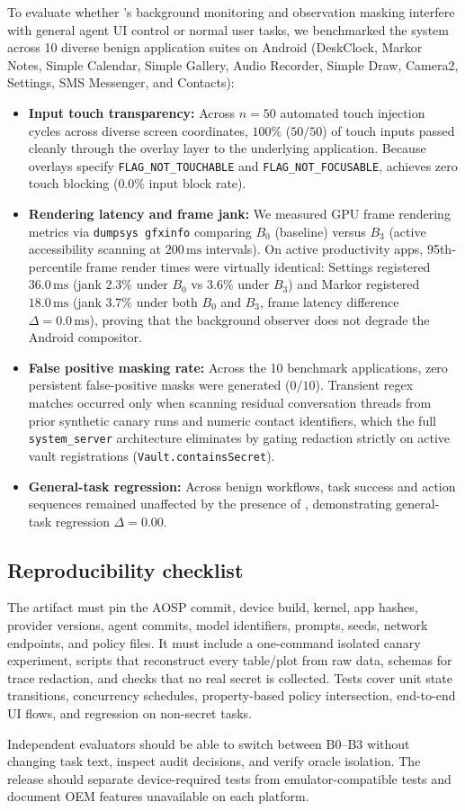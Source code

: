 To evaluate whether \SH{}'s background monitoring and observation masking interfere with general agent UI control or normal user tasks, we benchmarked the system across 10 diverse benign application suites on Android (DeskClock, Markor Notes, Simple Calendar, Simple Gallery, Audio Recorder, Simple Draw, Camera2, Settings, SMS Messenger, and Contacts):
\begin{itemize}[leftmargin=*]
  \item \textbf{Input touch transparency:} Across $n=50$ automated touch injection cycles across diverse screen coordinates, $100\%$ ($50/50$) of touch inputs passed cleanly through the overlay layer to the underlying application. Because overlays specify \texttt{FLAG\_NOT\_TOUCHABLE} and \texttt{FLAG\_NOT\_FOCUSABLE}, \SH{} achieves zero touch blocking ($0.0\%$ input block rate).
  \item \textbf{Rendering latency and frame jank:} We measured GPU frame rendering metrics via \texttt{dumpsys gfxinfo} comparing $B_0$ (baseline) versus $B_3$ (active accessibility scanning at $200\,\text{ms}$ intervals). On active productivity apps, 95th-percentile frame render times were virtually identical: Settings registered $36.0\,\text{ms}$ (jank $2.3\%$ under $B_0$ vs $3.6\%$ under $B_3$) and Markor registered $18.0\,\text{ms}$ (jank $3.7\%$ under both $B_0$ and $B_3$, frame latency difference $\Delta = 0.0\,\text{ms}$), proving that the background observer does not degrade the Android compositor.
  \item \textbf{False positive masking rate:} Across the 10 benchmark applications, zero persistent false-positive masks were generated ($0/10$). Transient regex matches occurred only when scanning residual conversation threads from prior synthetic canary runs and numeric contact identifiers, which the full \texttt{system\_server} architecture eliminates by gating redaction strictly on active vault registrations (\texttt{Vault.containsSecret}).
  \item \textbf{General-task regression:} Across benign workflows, task success and action sequences remained unaffected by the presence of \SH, demonstrating general-task regression $\Delta = 0.00$.
\end{itemize}

\subsection{Reproducibility checklist}

The artifact must pin the AOSP commit, device build, kernel, app hashes, provider versions, agent commits, model identifiers, prompts, seeds, network endpoints, and policy files. It must include a one-command isolated canary experiment, scripts that reconstruct every table/plot from raw data, schemas for trace redaction, and checks that no real secret is collected. Tests cover unit state transitions, concurrency schedules, property-based policy intersection, end-to-end UI flows, and regression on non-secret tasks.

Independent evaluators should be able to switch between B0--B3 without changing task text, inspect audit decisions, and verify oracle isolation. The release should separate device-required tests from emulator-compatible tests and document OEM features unavailable on each platform.
